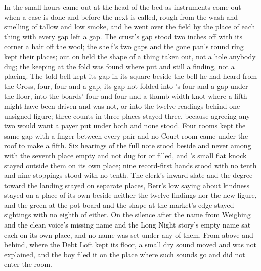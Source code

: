 In the small hours  came out at the head of the bed as instruments come out when a case is done and before the next is called, rough from the wash and smelling of tallow and low smoke, and he went over the field by the place of each thing with every gap left a gap. The crust's gap stood two inches off with its corner a hair off the wool; the shelf's two gaps and the gone pan's round ring kept their places;  out on  held the shape of a thing taken out, not a hole anybody dug; the keeping at the fold was found where put and still a finding, not a placing. The told bell kept its gap in its square beside the bell he had heard from the Cross, four, four and a gap, its gap not folded into 's four and a gap under the floor, into the boards' four and four and a thumb-width knot where a fifth might have been driven and was not, or into the twelve readings behind one unsigned figure; three counts in three places stayed three, because agreeing any two would want a payer put under both and none stood. Four rooms kept the same gap with a finger between every pair and no Court room came under the roof to make a fifth. Six hearings of the full note stood beside and never among with the seventh place empty and not dug for or filled, and 's small flat knock stayed outside them on its own place; nine record-first hands stood with no tenth and nine stoppings stood with no tenth. The clerk's inward slate and the degree toward the landing stayed on separate places, Berr's low saying about kindness stayed on a place of its own beside neither the twelve findings nor the new figure, and the green at the pot board and the shape at the market's edge stayed sightings with no eighth of either. On  the silence after the name from Weighing and the clean voice's missing name and the Long Night story's empty name sat each on its own place, and no name was set under any of them. From above and behind, where the Debt Loft kept its floor, a small dry sound moved and was not explained, and the boy filed it on the place where such sounds go and did not enter the room.

